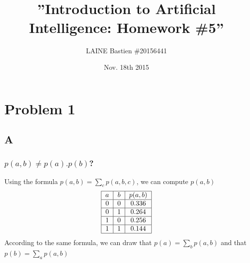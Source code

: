\documentclass{article}
\begin{document}
\title{\textbf{''Introduction to Artificial Intelligence: Homework \#5''}}
\author{LAINE Bastien \#20156441}
\date{Nov. 18th 2015}
\maketitle
\tableofcontents

\newpage
    \section{Problem 1}
        \subsection{A}
            \subsubsection{$p(a,b)\ne p(a).p(b)$?}
                Using the formula $p(a, b)=\sum_c p(a, b, c)$, we can compute $p(a, b)$
                \[
                    \begin{tabular}{|c|c|c|}
                        \hline
                        $a$&$b$&$p(a,b)$\\
                        \hline
                        0&0&0.336\\
                        \hline
                        0&1&0.264\\
                        \hline
                        1&0&0.256\\
                        \hline
                        1&1&0.144\\
                        \hline
                    \end{tabular}
                \]
                According to the same formula, we can draw that $p(a)=\sum_b p(a,b)$ and that $p(b)=\sum_a p(a,b)$
\end{document}
